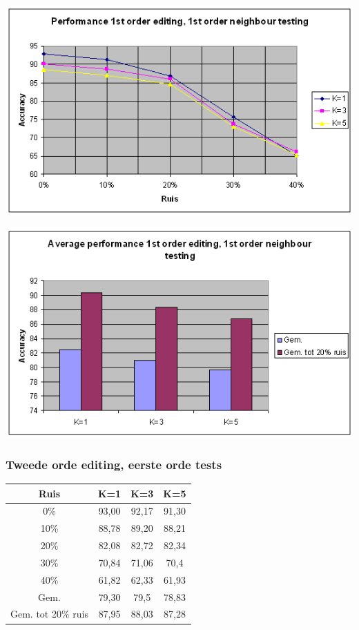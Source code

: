 \documentclass{article}
\begin{document}
\begin{center} \includegraphics[scale=0.7]{xor_1stordedit_1stordtest_lijn} \end{center}
\begin{center} \includegraphics[scale=0.7]{xor_1stordedit_1stordtest_staaf} \end{center}

\subsubsection{Tweede orde editing, eerste orde tests}
\begin{tabular}{|c|c|c|c|} \hline
Ruis &	K=1 &	K=3 &	K=5 \\ \hline
0\% &	93,00 &	92,17 &	91,30 \\
10\%	 & 88,78 & 	89,20 &	88,21 \\
20\%	 & 82,08	& 82,72	& 82,34 \\
30\%	 & 70,84	& 71,06 &	70,4 \\
40\%	 & 61,82	 & 62,33 &	61,93 \\
Gem.	& 79,30	& 79,5 &	78,83 \\
Gem. tot 20\% ruis &	87,95 &	88,03 &	87,28 \\ \hline
\end{tabular} \\
\end{document}

